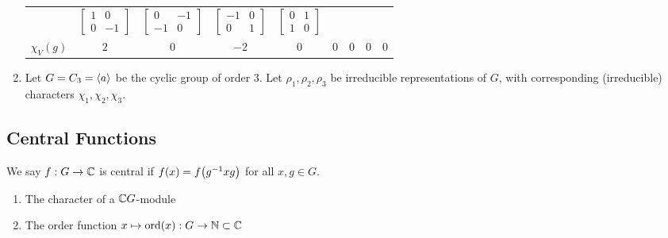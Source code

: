 \begin{boxexample}
\begin{enumerate}
\begin{table}[H]
\begin{tabular}{|c||c|c|c|c|c|c|c|c|}
                &
                $\begin{bmatrix} 1 & 0 \\ 0 & -1 \end{bmatrix}$
                &
                $\begin{bmatrix} 0 & -1 \\ -1 & 0 \end{bmatrix}$
                &
                $\begin{bmatrix} -1 & 0 \\ 0 & 1 \end{bmatrix}$
                &
                $\begin{bmatrix} 0 & 1 \\ 1 & 0 \end{bmatrix}$
                \\
                $\chi_V(g)$ & $2$ & $0$ & $-2$ & $0$ & $0$ & $0$ & $0$ & $0$ \\
                \hline
            \end{tabular}
        \end{table}

        \item Let $G = C_3 = \left\langle a \right\rangle$ be the cyclic group of order $3$. Let $\rho_1, \rho_2, \rho_3$ be irreducible representations of $G$, with corresponding (irreducible) characters $\chi_1, \chi_2, \chi_3$.
    \end{enumerate}
\end{boxexample}

\subsection{Central Functions}

\begin{boxdefinition}
    We say $f : G \to \mathbb{C}$ is central if $f\!\left( x \right) = f\!\left( g^{-1} x g \right)$ for all $x,g \in G$.
\end{boxdefinition}

\begin{boxexample}
    \hfill
    \begin{enumerate}
        \item The character of a $\mathbb{C} G$-module
        \item The order function $x \mapsto \operatorname{ord}\!\left( x \right) : G \to \mathbb{N} \subset \mathbb{C}$
    \end{enumerate}
\end{boxexample}

